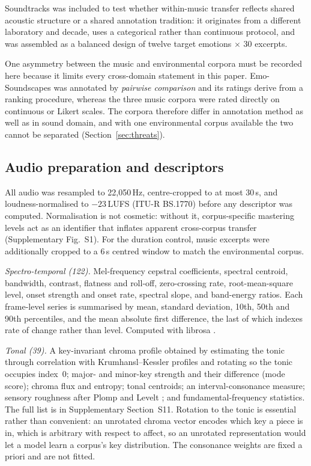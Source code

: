 Soundtracks was included to test whether within-music transfer reflects shared
acoustic structure or a shared annotation tradition: it originates from a
different laboratory and decade, uses a categorical rather than continuous
protocol, and was assembled as a balanced design of twelve target emotions
$\times$ 30 excerpts.

One asymmetry between the music and environmental corpora must be recorded
here because it limits every cross-domain statement in this paper.
Emo-Soundscapes was annotated by \emph{pairwise comparison} and its ratings
derive from a ranking procedure, whereas the three music corpora were rated
directly on continuous or Likert scales. The corpora therefore differ in
annotation method as well as in sound domain, and with one environmental
corpus available the two cannot be separated (Section~\ref{sec:threats}).

\subsection{Audio preparation and descriptors}

All audio was resampled to 22{,}050\,Hz, centre-cropped to at most 30\,s, and
loudness-normalised to $-23$\,LUFS (ITU-R BS.1770) before any descriptor was
computed. Normalisation is not cosmetic: without it, corpus-specific mastering
levels act as an identifier that inflates apparent cross-corpus transfer
(Supplementary Fig.~S1). For the duration control, music excerpts were
additionally cropped to a 6\,s centred window to match the environmental
corpus.

\emph{Spectro-temporal (122).} Mel-frequency cepstral coefficients, spectral
centroid, bandwidth, contrast, flatness and roll-off, zero-crossing rate,
root-mean-square level, onset strength and onset rate, spectral slope, and
band-energy ratios. Each frame-level series is summarised by mean, standard
deviation, 10th, 50th and 90th percentiles, and the mean absolute first
difference, the last of which indexes rate of change rather than level.
Computed with librosa \cite{mcfee2015}.

\emph{Tonal (39).} A key-invariant chroma profile obtained by estimating the
tonic through correlation with Krumhansl--Kessler profiles
\cite{krumhansl1982} and rotating so the tonic occupies index~0; major- and
minor-key strength and their difference (mode score); chroma flux and entropy;
tonal centroids; an interval-consonance measure; sensory roughness after Plomp
and Levelt \cite{plomp1965}; and fundamental-frequency statistics. The full
list is in Supplementary Section~S11. Rotation to the tonic is essential
rather than convenient: an unrotated chroma vector encodes which key a piece
is in, which is arbitrary with respect to affect, so an unrotated
representation would let a model learn a corpus's key distribution. The
consonance weights are fixed a priori and are not fitted.

